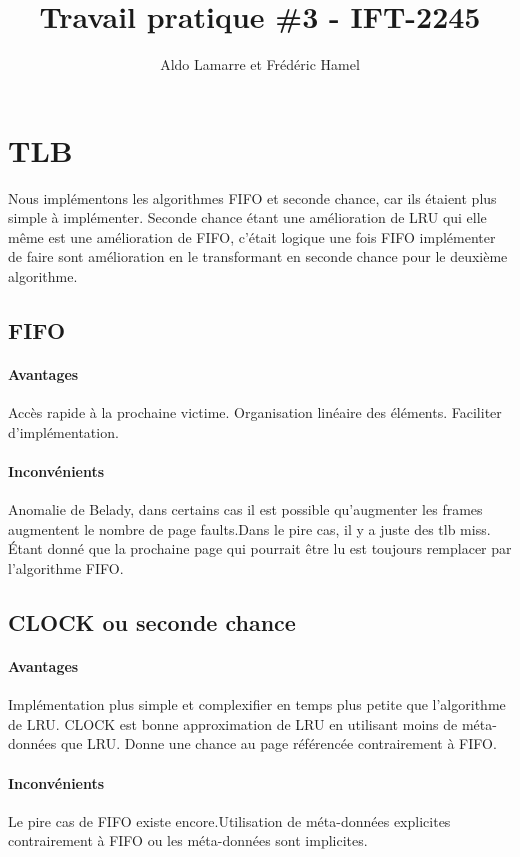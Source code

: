 \documentclass{article}
\title{Travail pratique \#3 - IFT-2245}
\author{Aldo Lamarre et Frédéric Hamel }
\begin{document}
\maketitle


\section*{TLB}
Nous implémentons les algorithmes FIFO et seconde chance, car ils étaient plus 
simple à implémenter. Seconde chance étant une amélioration de LRU qui elle 
même est une amélioration de FIFO, c'était logique une fois FIFO implémenter 
de faire sont amélioration en le transformant en seconde chance pour le 
deuxième algorithme.
\subsection{FIFO}
\paragraph{Avantages}
Accès rapide à la prochaine victime.
Organisation linéaire des éléments.
Faciliter d'implémentation. 

\paragraph{Inconvénients}
Anomalie de Belady, dans certains cas il est possible qu'augmenter les frames 
augmentent le nombre de page faults.Dans le pire cas, il y a juste des tlb miss.
Étant donné que la prochaine page qui pourrait être lu est toujours remplacer 
par l'algorithme FIFO. 

\subsection{CLOCK ou seconde chance}
\paragraph{Avantages}
Implémentation plus simple et complexifier en temps plus petite que l'algorithme de LRU.
CLOCK est bonne approximation de LRU en utilisant moins de méta-données que LRU.
Donne une chance au page référencée contrairement à FIFO.

\paragraph{Inconvénients}
Le pire cas de FIFO existe encore.Utilisation de méta-données explicites contrairement
 à FIFO ou les méta-données sont implicites. 
\end{document}
